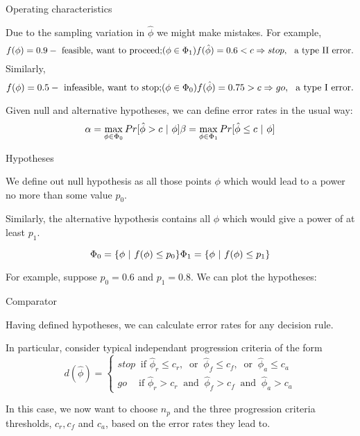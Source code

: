 \documentclass[
  ignorenonframetext,
]{beamer}
\begin{document}
\begin{frame}{Operating characteristics}
\protect\hypertarget{operating-characteristics}{}

Due to the sampling variation in \(\hat{\phi}\) we might make mistakes.
For example, \[
f(\phi) = 0.9 - \text{ feasible, want to proceed;} (\phi \in \Phi_1) \\
f(\hat{\phi}) = 0.6 < c \Rightarrow stop, ~ \text{ a type II error.}
\] Similarly, \[
f(\phi) = 0.5 - \text{ infeasible, want to stop;} (\phi \in \Phi_0) \\
f(\hat{\phi}) = 0.75 > c \Rightarrow go, ~ \text{ a type I error.}
\]

Given null and alternative hypotheses, we can define error rates in the
usual way: \[
\alpha = \max_{\phi \in \Phi_0} Pr[\hat{\phi} > c ~|~ \phi] \\
\beta = \max_{\phi \in \Phi_1} Pr[\hat{\phi} \leq c ~|~ \phi]
\]

\end{frame}

\begin{frame}{Hypotheses}
\protect\hypertarget{hypotheses}{}

We define out null hypothesis as all those points \(\phi\) which would
lead to a power no more than some value \(p_0\).

Similarly, the alternative hypothesis contains all \(\phi\) which would
give a power of at least \(p_1\).

\[ 
\Phi_0 = \{\phi ~|~ f(\phi) \leq p_0 \} \\
\Phi_1 = \{\phi ~|~ f(\phi) \leq p_1 \}
\]

For example, suppose \(p_0 = 0.6\) and \(p_1 = 0.8\). We can plot the
hypotheses:

\end{frame}

\begin{frame}{Comparator}
\protect\hypertarget{comparator}{}

Having defined hypotheses, we can calculate error rates for any decision
rule.

In particular, consider typical independant progression criteria of the
form \[
d(\hat{\phi}) = 
\begin{cases}
stop ~\text{ if } \hat{\phi}_r \leq c_r, ~\text{ or }~ \hat{\phi}_f \leq c_f, ~\text{ or }~ \hat{\phi}_a \leq c_a \\
go ~~~~\text{ if } \hat{\phi}_r > c_r ~\text{ and }~ \hat{\phi}_f > c_f ~\text{ and }~ \hat{\phi}_a > c_a
\end{cases}
\]

In this case, we now want to choose \(n_p\) and the three progression
criteria thresholds, \(c_r, c_f\) and \(c_a\), based on the error rates
they lead to.

\end{frame}
\end{document}
